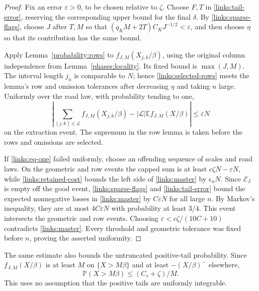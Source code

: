 \begin{proof}
Fix an error \(\varepsilon>0\), to be chosen relative to \(\zeta\).
Choose \(F,T\) in \eqref{links:tail-error}, reserving the corresponding
upper bound for the final \(\delta\). By \eqref{links:sparse-flags},
choose \(J\) after \(T,M\) so that
\((q_KM+2T)C_KJ^{-1/2}<\varepsilon\), and then choose \(\eta\) so
that its contribution has the same bound.

Apply Lemma~\ref{probability:rows} to
\(f_{J,M}(X_{j,k}/\beta)\), using the original column independence
from Lemma~\ref{phases:locality}. Its fixed bound is \(\max(J,M)\).
The interval length \(j_n\) is comparable to \(N\); hence
\eqref{links:selected-rows} meets the lemma's row and omission
tolerances after decreasing \(\eta\) and taking \(n\) large.
Uniformly over the road law, with probability tending to one,
\[
 \left|\sum_{(j,k)\in\mathcal L}f_{J,M}(X_{j,k}/\beta)
       -|\mathcal L|\mathbb E f_{J,M}(X/\beta)\right|
 \le\varepsilon N
\]
on the extraction event. The supremum in the row lemma is taken before
the rows and omissions are selected.

If \eqref{links:eq-one} failed uniformly, choose an offending sequence
of scales and road laws. On the geometric and row events the capped
sum is at least \(c\zeta N-\varepsilon N\), while
\eqref{links:retained-cost} bounds the left side of
\eqref{links:master} by \(\epsilon_nN\). Since \(\mathcal E_J\) is
empty off the good event, \eqref{links:sparse-flags} and
\eqref{links:tail-error} bound the expected nonnegative losses in
\eqref{links:master} by \(C\varepsilon N\) for all large \(n\).
By Markov's inequality, they are at most \(4C\varepsilon N\) with
probability at least \(3/4\). This event intersects the geometric and row events.
Choosing \(\varepsilon<c\zeta/(10C+10)\) contradicts
\eqref{links:master}. Every threshold and geometric tolerance was
fixed before \(n\), proving the asserted uniformity.
\end{proof}

The same estimate also bounds the untruncated positive-tail
probability. Since \(f_{J,M}(X/\beta)\) is at least \(M\) on
\(\{X>M\beta\}\) and at least \(-(X/\beta)^-\) elsewhere,
\begin{equation}
 \mathbb P(X>M\beta)\le(C_s+\zeta)/M.
 \label{links:positive-probability}
\end{equation}
This uses no assumption that the positive tails are uniformly integrable.

